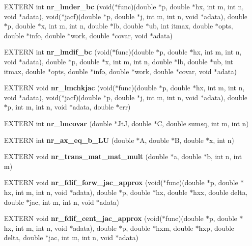 \begin{CompactItemize}
\item 
EXTERN int \textbf{nr\_\-lmder\_\-bc} (void($\ast$func)(double $\ast$p, double $\ast$hx, int m, int n, void $\ast$adata), void($\ast$jacf)(double $\ast$p, double $\ast$j, int m, int n, void $\ast$adata), double $\ast$p, double $\ast$x, int m, int n, double $\ast$lb, double $\ast$ub, int itmax, double $\ast$opts, double $\ast$info, double $\ast$work, double $\ast$covar, void $\ast$adata)\label{group__nr_g55db15253f85ccac7c985280705da745}

\item 
EXTERN int \textbf{nr\_\-lmdif\_\-bc} (void($\ast$func)(double $\ast$p, double $\ast$hx, int m, int n, void $\ast$adata), double $\ast$p, double $\ast$x, int m, int n, double $\ast$lb, double $\ast$ub, int itmax, double $\ast$opts, double $\ast$info, double $\ast$work, double $\ast$covar, void $\ast$adata)\label{group__nr_ga343a39b99f7bb25b97134a743a81a20}

\item 
EXTERN void \textbf{nr\_\-lmchkjac} (void($\ast$func)(double $\ast$p, double $\ast$hx, int m, int n, void $\ast$adata), void($\ast$jacf)(double $\ast$p, double $\ast$j, int m, int n, void $\ast$adata), double $\ast$p, int m, int n, void $\ast$adata, double $\ast$err)\label{group__nr_gc0c5d8dc11fc35234e751fbc54a6a185}

\item 
EXTERN int \textbf{nr\_\-lmcovar} (double $\ast$JtJ, double $\ast$C, double sumsq, int m, int n)\label{group__nr_g2e38d1d3a33b269e190fb0edd3fc3303}

\item 
EXTERN int \textbf{nr\_\-ax\_\-eq\_\-b\_\-LU} (double $\ast$A, double $\ast$B, double $\ast$x, int n)\label{group__nr_g50388d5d50f760129a054ea526ed1c07}

\item 
EXTERN void \textbf{nr\_\-trans\_\-mat\_\-mat\_\-mult} (double $\ast$a, double $\ast$b, int n, int m)\label{group__nr_gb647cf24b2b6ab2a0dd993ba4021447c}

\item 
EXTERN void \textbf{nr\_\-fdif\_\-forw\_\-jac\_\-approx} (void($\ast$func)(double $\ast$p, double $\ast$hx, int m, int n, void $\ast$adata), double $\ast$p, double $\ast$hx, double $\ast$hxx, double delta, double $\ast$jac, int m, int n, void $\ast$adata)\label{group__nr_gf20223185cc5c2a215cb6559231dd55b}

\item 
EXTERN void \textbf{nr\_\-fdif\_\-cent\_\-jac\_\-approx} (void($\ast$func)(double $\ast$p, double $\ast$hx, int m, int n, void $\ast$adata), double $\ast$p, double $\ast$hxm, double $\ast$hxp, double delta, double $\ast$jac, int m, int n, void $\ast$adata)\label{group__nr_geab4b93cc9d2f74f4c1859204fc9e694}


\end{CompactItemize}
